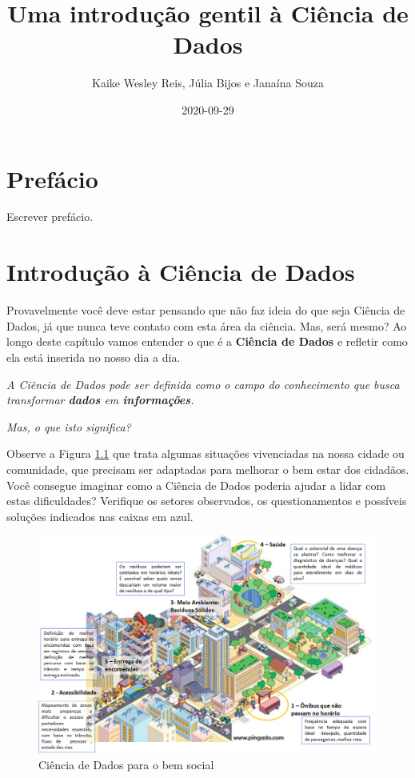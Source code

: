 \documentclass[
  portuguese,
  oneside]{book}
\title{Uma introdução gentil à Ciência de Dados}
\author{Kaike Wesley Reis, Júlia Bijos e Janaína Souza}
\date{2020-09-29}
\begin{document}
\maketitle

{
\setcounter{tocdepth}{1}
\tableofcontents
}
\hypertarget{prefuxe1cio}{%
\chapter*{Prefácio}\label{prefuxe1cio}}

Escrever prefácio.

\hypertarget{c01}{%
\chapter{Introdução à Ciência de Dados}\label{c01}}

Provavelmente você deve estar pensando que não faz ideia do que seja Ciência de Dados, já que nunca teve contato com esta área da ciência. Mas, será mesmo? Ao longo deste capítulo vamos entender o que é a \textbf{Ciência de Dados} e refletir como ela está inserida no nosso dia a dia.

\emph{A Ciência de Dados pode ser definida como o campo do conhecimento que busca transformar \textbf{dados} em \textbf{informações}.}

\emph{Mas, o que isto significa?}

Observe a Figura \ref{fig:figura1} que trata algumas situações vivenciadas na nossa cidade ou comunidade, que precisam ser adaptadas para melhorar o bem estar dos cidadãos. Você consegue imaginar como a Ciência de Dados poderia ajudar a lidar com estas dificuldades? Verifique os setores observados, os questionamentos e possíveis soluções indicados nas caixas em azul.

\begin{figure}

{\centering \includegraphics[width=1\linewidth]{fig_cap1/cidade_legend} 

}

\caption{Ciência de Dados para o bem social}\label{fig:figura1}
\end{figure}
\end{document}
